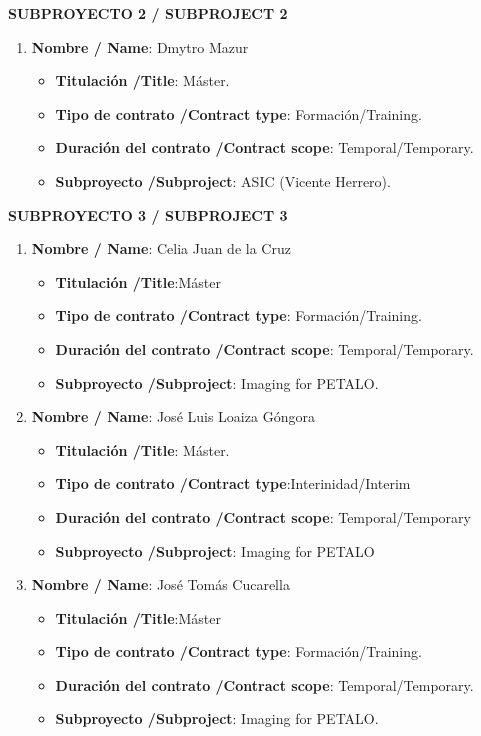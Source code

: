 \noindent\textbf{SUBPROYECTO 2 / SUBPROJECT 2}
\begin{enumerate}
\item {\bf Nombre / Name}: Dmytro Mazur
\begin{itemize}
\item {\bf Titulación /Title}: Máster.
\item {\bf Tipo de contrato /Contract type}: Formación/Training.
\item {\bf Duración del contrato /Contract scope}: Temporal/Temporary.
\item {\bf Subproyecto /Subproject}: ASIC (Vicente Herrero).
\end{itemize}
\end{enumerate}

\noindent\textbf{SUBPROYECTO 3 / SUBPROJECT 3}
\begin{enumerate}
 \item {\bf Nombre / Name}: Celia Juan de la Cruz
 \begin{itemize}
 \item {\bf Titulación /Title}:Máster
 \item {\bf Tipo de contrato /Contract type}: Formación/Training.
 \item {\bf Duración del contrato /Contract scope}: Temporal/Temporary.
 \item {\bf Subproyecto /Subproject}: Imaging for PETALO.
 \end{itemize}
 \item {\bf Nombre / Name}: José Luis Loaiza Góngora
 \begin{itemize}
 \item {\bf Titulación /Title}: Máster.
 \item {\bf Tipo de contrato /Contract type}:Interinidad/Interim
 \item {\bf Duración del contrato /Contract scope}: Temporal/Temporary
\item {\bf Subproyecto /Subproject}: Imaging for PETALO
 \end{itemize}
 \item {\bf Nombre / Name}: José Tomás Cucarella
 \begin{itemize}
 \item {\bf Titulación /Title}:Máster
 \item {\bf Tipo de contrato /Contract type}: Formación/Training.
 \item {\bf Duración del contrato /Contract scope}: Temporal/Temporary.
 \item {\bf Subproyecto /Subproject}: Imaging for PETALO.
 \end{itemize}
 \end{enumerate}
